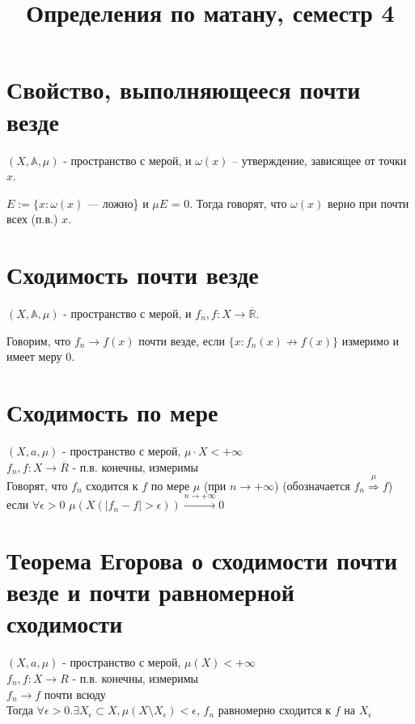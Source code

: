 \documentclass[paper=a4, fontsize=17pt]{article}
\title{Определения по матану, семестр 4}
\begin{document}
	\maketitle
	\tableofcontents
	\newpage
	
	\section{Свойство, выполняющееся почти везде}
	$ (X,\mathds{A},\mu)$  - пространство с мерой, и $\omega (x)$  -- утверждение, зависящее от точки $x$.
	
	$E := \{x: \omega(x) $ --- ложно\} и $\mu E$ = 0. Тогда говорят, что $\omega (x)$ верно при почти всех (п.в.) $x$.
	
	\section{Сходимость почти везде}
	$ (X,\mathds{A},\mu)$  - пространство с мерой, и $f_n, f: X \rightarrow \overline{\mathds{R}}.$
	
	Говорим, что $f_n \rightarrow f(x)$ почти везде, если $\{x: f_n(x) \not \rightarrow f(x)\}$ измеримо и имеет меру $0$.
	
	\section{Сходимость по мере}
	$(X, a, \mu)$ - пространство с мерой, $\mu \cdot X < +\infty$ \\
	$f_n , f : X \rightarrow \overline R$ - п.в. конечны, измеримы\\
	Говорят, что $f_n$ сходится к $f$ по мере $\mu$ (при $n \rightarrow +\infty$) (обозначается $f_n\stackrel{\mu}{\Rightarrow}f$) если $\forall\epsilon > 0$ $\mu(X(|f_n - f| > \epsilon))\stackrel{n\rightarrow+\infty}{\rightarrow} 0$
	
	\section{Теорема Егорова о сходимости почти везде и почти равномерной сходимости}
	$(X, a, \mu)$ - пространство с мерой, $\mu(X) < + \infty$\\
	$f_n , f : X \rightarrow R$ - п.в. конечны, измеримы \\
	$f_n \rightarrow f$ почти всюду \\
	Тогда $\forall \epsilon > 0. \exists X_{\epsilon} \subset X, \mu(X \setminus X_{\epsilon}) < \epsilon$, $f_n$ равномерно сходится к $f$ на $X_{\epsilon}$
	
\end{document}

